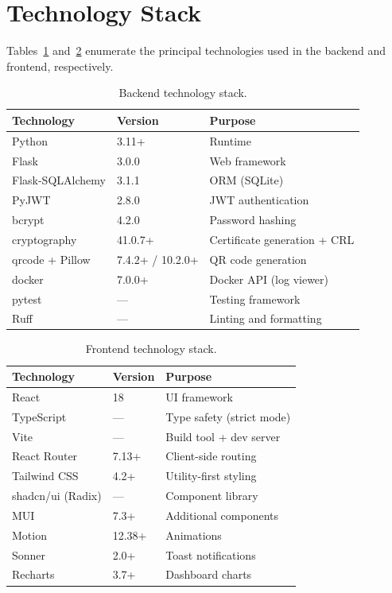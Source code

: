 \documentclass[12pt,letterpaper]{report}
\begin{document}
\section{Technology Stack}

Tables~\ref{tab:backend-stack} and~\ref{tab:frontend-stack} enumerate the principal technologies used in the backend and frontend, respectively.

\begin{table}[ht]
\centering
\caption{Backend technology stack.}
\label{tab:backend-stack}
\small
\begin{tabular}{lll}
\hline
\textbf{Technology} & \textbf{Version} & \textbf{Purpose} \\
\hline
Python & 3.11+ & Runtime \\
Flask & 3.0.0 & Web framework \\
Flask-SQLAlchemy & 3.1.1 & ORM (SQLite) \\
PyJWT & 2.8.0 & JWT authentication \\
bcrypt & 4.2.0 & Password hashing \\
cryptography & 41.0.7+ & Certificate generation + CRL \\
qrcode + Pillow & 7.4.2+ / 10.2.0+ & QR code generation \\
docker & 7.0.0+ & Docker API (log viewer) \\
pytest & --- & Testing framework \\
Ruff & --- & Linting and formatting \\
\hline
\end{tabular}
\end{table}

\begin{table}[ht]
\centering
\caption{Frontend technology stack.}
\label{tab:frontend-stack}
\small
\begin{tabular}{lll}
\hline
\textbf{Technology} & \textbf{Version} & \textbf{Purpose} \\
\hline
React & 18 & UI framework \\
TypeScript & --- & Type safety (strict mode) \\
Vite & --- & Build tool + dev server \\
React Router & 7.13+ & Client-side routing \\
Tailwind CSS & 4.2+ & Utility-first styling \\
shadcn/ui (Radix) & --- & Component library \\
MUI & 7.3+ & Additional components \\
Motion & 12.38+ & Animations \\
Sonner & 2.0+ & Toast notifications \\
Recharts & 3.7+ & Dashboard charts \\
\hline
\end{tabular}
\end{table}
\end{document}
